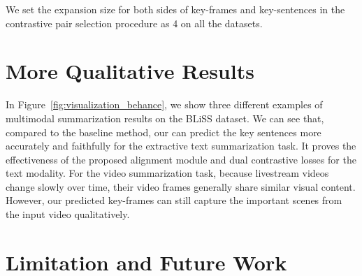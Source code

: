 We set the expansion size for both sides of key-frames and key-sentences in the contrastive pair selection procedure as 4 on all the datasets.


\begin{figure*}[t]
\vspace{-0.1in}
\centering
    \caption{Visualization of multimodal summarization results for the BLiSS dataset. The ground-truth text summary, predictions from the baseline model and our \system are shown for each video. ``Baseline'' denotes our \system without the proposed alignment module and dual contrastive losses. The ground-truth keywords from key sentences are marked with \textcolor{-red!70!green}{blue} color. We also show the corresponding video frames for each transcribed sentence where the frames with \textcolor{red}{red} boxes represent some of the predicted key-frames from our \system. The title for each video clip is the annotated abstractive summary. }
\vspace{-0.15in}
\label{fig:visualization_behance}
\end{figure*}

\section{More Qualitative Results}
\label{sec:qualitative_more}
\vspace{-0.05in}

In Figure~\ref{fig:visualization_behance}, we show three different examples of multimodal summarization results on the BLiSS dataset.
We can see that, compared to the baseline method, our \system can predict the key sentences more accurately and faithfully for the extractive text summarization task. 
It proves the effectiveness of the proposed alignment module and dual contrastive losses for the text modality.
For the video summarization task, because livestream videos change slowly over time, their video frames generally share similar visual content. However, our predicted key-frames can still capture the important scenes from the input video qualitatively.

\section{Limitation and Future Work}
\label{sec:limitation}
\vspace{-0.05in}

